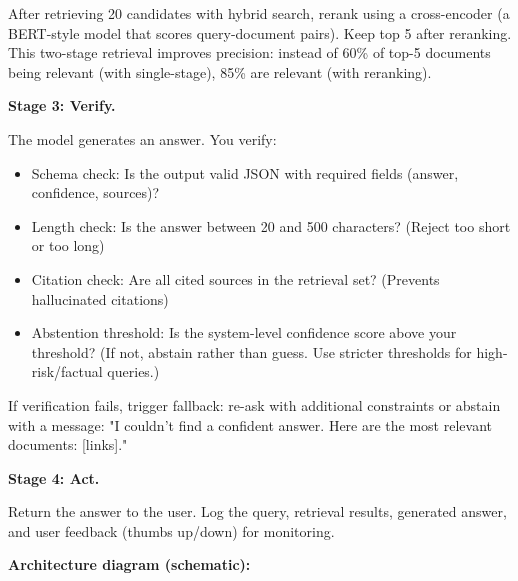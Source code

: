 After retrieving 20 candidates with hybrid search, rerank using a cross-encoder (a BERT-style model that scores query-document pairs). Keep top 5 after reranking. This two-stage retrieval improves precision: instead of 60\% of top-5 documents being relevant (with single-stage), 85\% are relevant (with reranking).

\textbf{Stage 3: Verify.}

The model generates an answer. You verify:
\begin{itemize}
\item Schema check: Is the output valid JSON with required fields (answer, confidence, sources)?
\item Length check: Is the answer between 20 and 500 characters? (Reject too short or too long)
\item Citation check: Are all cited sources in the retrieval set? (Prevents hallucinated citations)
\item Abstention threshold: Is the system-level confidence score above your threshold? (If not, abstain rather than guess. Use stricter thresholds for high-risk/factual queries.)
\end{itemize}

If verification fails, trigger fallback: re-ask with additional constraints or abstain with a message: "I couldn't find a confident answer. Here are the most relevant documents: [links]."

\textbf{Stage 4: Act.}

Return the answer to the user. Log the query, retrieval results, generated answer, and user feedback (thumbs up/down) for monitoring.

\textbf{Architecture diagram (schematic):}

